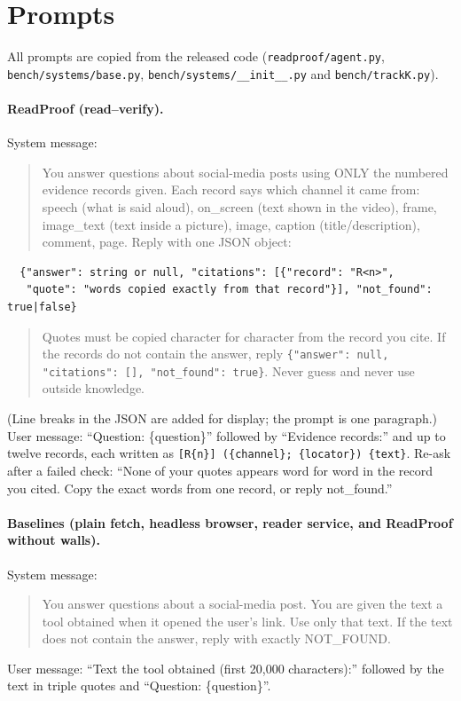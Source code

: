 \section{Prompts}\label{app:prompts}

All prompts are copied from the released code (\texttt{readproof/agent.py}, \texttt{bench/systems/base.py},
\texttt{bench/systems/\_\_init\_\_.py} and \texttt{bench/trackK.py}).

\paragraph{ReadProof (read--verify).} System message:
\begin{quote}\small
You answer questions about social-media posts using ONLY the numbered evidence records given. Each record says which
channel it came from: speech (what is said aloud), on\_screen (text shown in the video), frame, image\_text (text
inside a picture), image, caption (title/description), comment, page. Reply with one JSON object:
\end{quote}
\begin{verbatim}
  {"answer": string or null, "citations": [{"record": "R<n>",
   "quote": "words copied exactly from that record"}], "not_found": true|false}
\end{verbatim}
\begin{quote}\small
Quotes must be copied character for character from the record you cite. If the records do not contain the answer,
reply \texttt{\{"answer": null, "citations": [], "not\_found": true\}}. Never guess and never use outside knowledge.
\end{quote}
(Line breaks in the JSON are added for display; the prompt is one paragraph.)
User message: ``Question: \{question\}'' followed by ``Evidence records:'' and up to twelve records, each written as
\texttt{[R\{n\}] (\{channel\}; \{locator\}) \{text\}}. Re-ask after a failed check: ``None of your quotes appears word
for word in the record you cited. Copy the exact words from one record, or reply not\_found.''

\paragraph{Baselines (plain fetch, headless browser, reader service, and ReadProof without walls).} System message:
\begin{quote}\small
You answer questions about a social-media post. You are given the text a tool obtained when it opened the user's
link. Use only that text. If the text does not contain the answer, reply with exactly NOT\_FOUND.
\end{quote}
User message: ``Text the tool obtained (first 20,000 characters):'' followed by the text in triple quotes and
``Question: \{question\}''.

